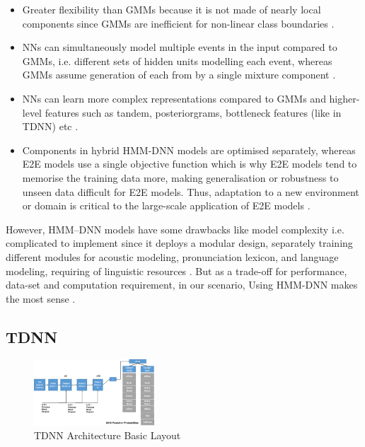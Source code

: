 \begin{itemize}
    \item Greater flexibility than GMMs because it is not made of nearly local components since GMMs are inefficient for non-linear class boundaries \cite{bell_adaptation_2021}.
    \item NNs can simultaneously model multiple events in the input compared to GMMs, i.e. different sets of hidden units modelling each event, whereas GMMs assume generation of each from by a single mixture component \cite{hussein_arabic_2022}.
    \item NNs can learn more complex representations compared to GMMs and higher-level features such as tandem, posteriorgrams, bottleneck features (like in TDNN) etc \cite{liu_time_2019}.
    \item Components in hybrid HMM-DNN models are optimised separately, whereas E2E models use a single objective function which is why E2E models tend to memorise the training data more, making generalisation or robustness to unseen data difficult for E2E models. Thus, adaptation to a new environment or domain is critical to the large-scale application of E2E models \cite{backstrom_introduction_2022}. 
\end{itemize}

However, HMM–DNN models have some drawbacks like model complexity i.e. complicated to implement since it deploys a modular design, separately training different modules for acoustic modeling, pronunciation lexicon, and language modeling,  requiring of linguistic resources \cite{hussein_arabic_2022}. But as a trade-off for performance, data-set and computation requirement, in our scenario, Using HMM-DNN makes the most sense \cite{georgescu_performance_2021}.

\subsection{TDNN}

\begin{figure}[htb]
    \centering
    \includegraphics[width=0.40\textwidth]{img/TDNN2.png}
    \caption{TDNN Architecture Basic Layout}
    \label{fig:TDNN-arch}
\end{figure}

